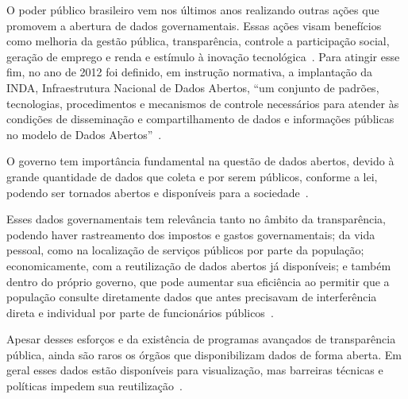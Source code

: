 O poder público brasileiro vem nos últimos anos realizando outras ações que promovem a abertura de dados governamentais. Essas ações visam benefícios como melhoria da gestão pública, transparência, controle a participação social, geração de emprego e renda e estímulo à inovação tecnológica~\cite{tcu}. Para atingir esse fim, no ano de 2012 foi definido, em instrução normativa, a implantação da INDA, Infraestrutura Nacional de Dados Abertos, \enquote{um conjunto de padrões, tecnologias, procedimentos e mecanismos de controle necessários para atender às condições de disseminação e compartilhamento de dados e informações públicas no modelo de Dados Abertos}~\cite{inda}.  

O governo tem importância fundamental na questão de dados abertos, devido à grande quantidade de dados que coleta e por serem públicos, conforme a lei, podendo ser tornados abertos e disponíveis para a sociedade~\cite{openknowledge}.

Esses dados governamentais tem relevância tanto no âmbito da transparência, podendo haver rastreamento dos impostos e gastos governamentais; da vida pessoal, como na localização de serviços públicos por parte da população; economicamente, com a reutilização de dados abertos já disponíveis; e também dentro do próprio governo, que pode aumentar sua eficiência ao permitir que a população consulte diretamente dados que antes precisavam de interferência direta e individual por parte de funcionários públicos~\cite{openknowledge}.

Apesar desses esforços e da existência de programas avançados de transparência pública, ainda são raros os órgãos que disponibilizam dados de forma aberta. Em geral esses dados estão disponíveis para visualização, mas barreiras técnicas e políticas impedem sua reutilização~\cite{w3cmanual}.









